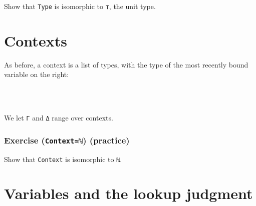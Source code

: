Show that \texttt{Type} is isomorphic to \texttt{⊤}, the unit type.

\begin{fence}
\begin{code}%
\>[0]\<%
\end{code}
\end{fence}

\hypertarget{contexts}{%
\section{Contexts}\label{contexts}}

As before, a context is a list of types, with the type of the most
recently bound variable on the right:

\begin{fence}
\begin{code}%
\>[0]\AgdaSpace{}%
\AgdaSpace{}%
\AgdaSymbol{:}\AgdaSpace{}%
\AgdaSpace{}%
\<%
\\
\>[0][@{}l@{\AgdaIndent{0}}]%
\>[2]%
\>[6]\AgdaSymbol{:}\AgdaSpace{}%
\<%
\\
%
\>[2]\AgdaOperator{\AgdaInductiveConstructor{\AgdaUnderscore{},\AgdaUnderscore{}}}\AgdaSpace{}%
\AgdaSymbol{:}\AgdaSpace{}%
\AgdaSpace{}%
\AgdaSpace{}%
\AgdaSpace{}%
\AgdaSpace{}%
\<%
\end{code}
\end{fence}

We let \texttt{Γ} and \texttt{Δ} range over contexts.

\hypertarget{exercise-contextux2115-practice}{%
\subsubsection{\texorpdfstring{Exercise (\texttt{Context≃ℕ})
(practice)}{Exercise (Context≃ℕ) (practice)}}\label{exercise-contextux2115-practice}}

Show that \texttt{Context} is isomorphic to \texttt{ℕ}.

\begin{fence}
\begin{code}%
\>[0]\<%
\end{code}
\end{fence}

\hypertarget{variables-and-the-lookup-judgment}{%
\section{Variables and the lookup
judgment}\label{variables-and-the-lookup-judgment}}

